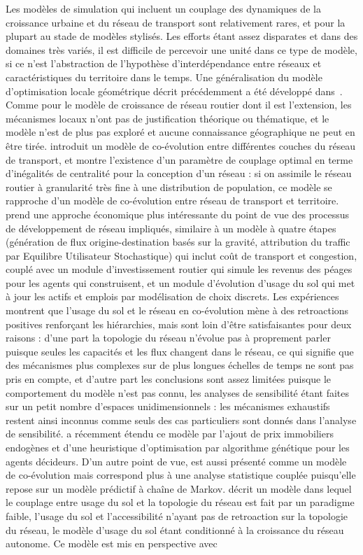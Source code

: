 {}{
Les modèles de simulation qui incluent un couplage des dynamiques de la croissance urbaine et du réseau de transport sont relativement rares, et pour la plupart au stade de modèles stylisés. Les efforts étant assez disparates et dans des domaines très variés, il est difficile de percevoir une unité dans ce type de modèle, si ce n'est l'abstraction de l'hypothèse d'interdépendance entre réseaux et caractéristiques du territoire dans le temps. Une généralisation du modèle d'optimisation locale géométrique décrit précédemment a été développé dans~\cite{barthelemy2009co}. Comme pour le modèle de croissance de réseau routier dont il est l'extension, les mécanismes locaux n'ont pas de justification théorique ou thématique, et le modèle n'est de plus pas exploré et aucune connaissance géographique ne peut en être tirée. \cite{ding2017heuristic} introduit un modèle de co-évolution entre différentes couches du réseau de transport, et montre l'existence d'un paramètre de couplage optimal en terme d'inégalités de centralité pour la conception d'un réseau : si on assimile le réseau routier à granularité très fine à une distribution de population, ce modèle se rapproche d'un modèle de co-évolution entre réseau de transport et territoire.\cite{levinson2007co} prend une approche économique plus intéressante du point de vue des processus de développement de réseau impliqués, similaire à un modèle à quatre étapes (génération de flux origine-destination basés sur la gravité, attribution du traffic par Equilibre Utilisateur Stochastique) qui inclut coût de transport et congestion, couplé avec un module d'investissement routier qui simule les revenus des péages pour les agents qui construisent, et un module d'évolution d'usage du sol qui met à jour les actifs et emplois par modélisation de choix discrets. Les expériences montrent que l'usage du sol et le réseau en co-évolution mène à des retroactions positives renforçant les hiérarchies, mais sont loin d'être satisfaisantes pour deux raisons : d'une part la topologie du réseau n'évolue pas à proprement parler puisque seules les capacités et les flux changent dans le réseau, ce qui signifie que des mécanismes plus complexes sur de plus longues échelles de temps ne sont pas pris en compte, et d'autre part les conclusions sont assez limitées puisque le comportement du modèle n'est pas connu, les analyses de sensibilité étant faites sur un petit nombre d'espaces unidimensionnels : les mécanismes exhaustifs restent ainsi inconnus comme seuls des cas particuliers sont donnés dans l'analyse de sensibilité. \cite{li2016integrated} a récemment étendu ce modèle par l'ajout de prix immobiliers endogènes et d'une heuristique d'optimisation par algorithme génétique pour les agents décideurs. D'un autre point de vue, \cite{levinson2005paving} est aussi présenté comme un modèle de co-évolution mais correspond plus à une analyse statistique couplée puisqu'elle repose sur un modèle prédictif à chaîne de Markov. \cite{rui2011urban} décrit un modèle dans lequel le couplage entre usage du sol et la topologie du réseau est fait par un paradigme faible, l'usage du sol et l'accessibilité n'ayant pas de retroaction sur la topologie du réseau, le modèle d'usage du sol étant conditionné à la croissance du réseau autonome. Ce modèle est mis en perspective avec }

